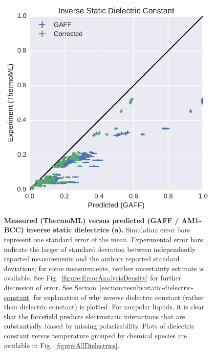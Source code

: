 \documentclass[aip, jcp, reprint]{revtex4-1}  %
\begin{document}

\begin{figure}
\includegraphics[width=\columnwidth]{./figures/dielectrics_thermoml.pdf}

\caption{{\bf Measured (ThermoML) versus predicted (GAFF / AM1-BCC) inverse static dielectrics (a).}
Simulation error bars represent one standard error of the mean.  
Experimental error bars indicate the larger of standard deviation between independently reported measurements and the authors reported standard deviations; for some measurements, neither uncertainty estimate is available.  
See Fig.~\ref{figure:ErrorAnalysisDensity} for further discussion of error.  
See Section~\ref{section:results:static-dielectric-constant} for explanation of why inverse dielectric constant (rather than dielectric constant) is plotted. 
For nonpolar liquids, it is clear that the forcefield predicts electrostatic interactions that are substantially biased by missing polarizability.
Plots of dielectric constant versus temperature grouped by chemical species are available in Fig.~\ref{figure:AllDielectrics}.
}
\label{figure:Dielectric}
\end{figure}
\end{document}
